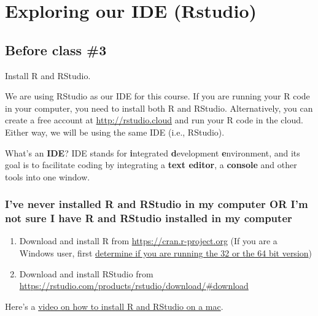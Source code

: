 \documentclass[
]{book}
\providecommand{\tightlist}{%
  \setlength{\itemsep}{0pt}\setlength{\parskip}{0pt}}
\begin{document}
\hypertarget{install-r}{%
\chapter{Exploring our IDE (Rstudio)}\label{install-r}}

\hypertarget{before-class-3}{%
\section{Before class \#3}\label{before-class-3}}

Install R and RStudio.

We are using RStudio as our IDE for this course. If you are running your R code in your computer, you need to install both R and RStudio. Alternatively, you can create a free account at \url{http://rstudio.cloud} and run your R code in the cloud. Either way, we will be using the same IDE (i.e., RStudio).

What's an \textbf{IDE}? IDE stands for \textbf{i}ntegrated \textbf{d}evelopment \textbf{e}nvironment, and its goal is to facilitate coding by integrating a \textbf{text editor}, a \textbf{console} and other tools into one window.

\hypertarget{ive-never-installed-r-and-rstudio-in-my-computer-or-im-not-sure-i-have-r-and-rstudio-installed-in-my-computer}{%
\subsection{I've never installed R and RStudio in my computer OR I'm not sure I have R and RStudio installed in my computer}\label{ive-never-installed-r-and-rstudio-in-my-computer-or-im-not-sure-i-have-r-and-rstudio-installed-in-my-computer}}

\begin{enumerate}
\def\labelenumi{\arabic{enumi}.}
\tightlist
\item
  Download and install R from \url{https://cran.r-project.org} (If you are a Windows user, first \href{https://www.computerhope.com/issues/ch001121.htm\#:~:text=Press\%20and\%20hold\%20the\%20Windows,running\%20the\%2064\%2Dbit\%20version.}{determine if you are running the 32 or the 64 bit version})
\item
  Download and install RStudio from \url{https://rstudio.com/products/rstudio/download/\#download}
\end{enumerate}

Here's a \href{https://youtu.be/Iwp8bm7w4fQ}{video on how to install R and RStudio on a mac}.
\end{document}

